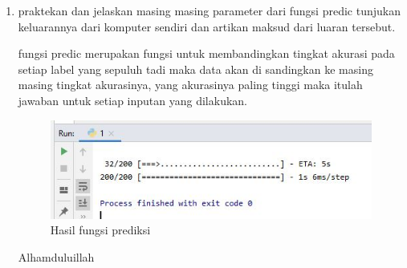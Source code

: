 \begin{enumerate}
\item praktekan dan jelaskan masing masing parameter dari fungsi predic  tunjukan keluarannya dari komputer sendiri dan artikan maksud dari luaran tersebut. \par 
\subitem fungsi predic merupakan fungsi untuk membandingkan tingkat akurasi pada setiap label yang sepuluh tadi maka data akan di sandingkan ke masing masing tingkat akurasinya, yang akurasinya paling tinggi maka itulah jawaban untuk setiap inputan yang dilakukan. 

\begin{figure}[ht]
\centering
\includegraphics[scale=0.5]{figures/1174070/6/2,11.JPG}
\caption{Hasil fungsi prediksi}
\label{contoh}
\end{figure}

Alhamduluillah
\end{enumerate}

